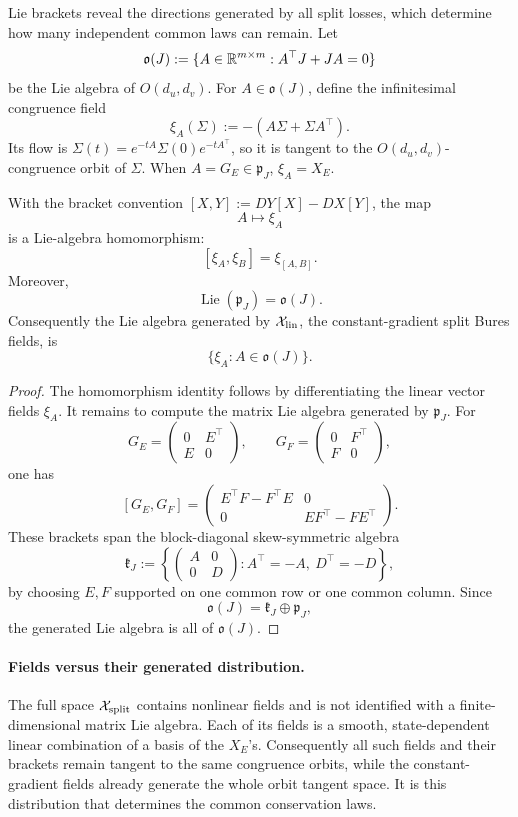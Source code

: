 Lie brackets reveal the directions generated by all split losses,
which determine how many independent common laws can remain.
Let
\[
\mathfrak o(J):=\{A\in\mathbb{R}^{m\times m}:A^\top J+JA=0\}
\]
be the Lie algebra of \(O(d_u,d_v)\).  For \(A\in\mathfrak o(J)\), define the
infinitesimal congruence field
\[
\xi_A(\Sigma):=-(A\Sigma+\Sigma A^\top).
\]
Its flow is \(\Sigma(t)=e^{-tA}\Sigma(0)e^{-tA^\top}\), so it is tangent to
the \(O(d_u,d_v)\)-congruence orbit of \(\Sigma\).  When \(A=G_E\in\mathfrak p_J\),
\(\xi_A=X_E\).

\begin{proposition}
\label{prop:appendix-lie-generated}
With the bracket convention \([X,Y]:=DY[X]-DX[Y]\), the map
\[
A\longmapsto \xi_A
\]
is a Lie-algebra homomorphism:
\[
[\xi_A,\xi_B]=\xi_{[A,B]}.
\]
Moreover,
\[
\operatorname{Lie}(\mathfrak p_J)=\mathfrak o(J).
\]
Consequently the Lie algebra generated by
\(\mathcal X_{\rm lin}\), the constant-gradient split Bures fields, is
\[
\{\xi_A:A\in\mathfrak o(J)\}.
\]
\end{proposition}

\begin{proof}
The homomorphism identity follows by differentiating the linear vector fields
\(\xi_A\).  It remains to compute the matrix Lie algebra generated by
\(\mathfrak p_J\).  For
\[
G_E=
\begin{pmatrix}
0&E^\top\\
E&0
\end{pmatrix},
\qquad
G_F=
\begin{pmatrix}
0&F^\top\\
F&0
\end{pmatrix},
\]
one has
\[
[G_E,G_F]
=
\begin{pmatrix}
E^\top F-F^\top E&0\\
0&EF^\top-FE^\top
\end{pmatrix}.
\]
These brackets span the block-diagonal skew-symmetric algebra
\[
\mathfrak k_J:=
\left\{
\begin{pmatrix}
A&0\\
0&D
\end{pmatrix}:A^\top=-A,\ D^\top=-D
\right\},
\]
by choosing \(E,F\) supported on one common row or one common column.  Since
\[
\mathfrak o(J)=\mathfrak k_J\oplus\mathfrak p_J,
\]
the generated Lie algebra is all of \(\mathfrak o(J)\).
\end{proof}

\paragraph{Fields versus their generated distribution.}
The full space \(\mathcal X_{\rm split}\) contains nonlinear fields and
is not identified with a finite-dimensional matrix Lie algebra. Each
of its fields is a smooth, state-dependent linear combination of a
basis of the \(X_E\)'s. Consequently all such fields and their brackets
remain tangent to the same congruence orbits, while the constant-gradient
fields already generate the whole orbit tangent space. It is this
distribution that determines the common conservation laws.

